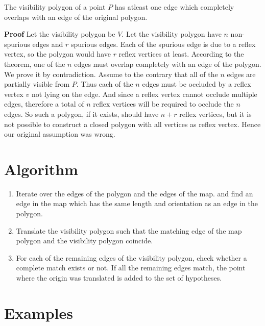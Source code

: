 \begin{theorem}
 The visibility polygon of a point $P$ has atleast one edge which completely overlaps with an edge of the original polygon.
\end{theorem}
{\bf Proof} Let the visibility polygon be $V$. Let the visibility polygon have $n$ non-spurious edges and $r$ spurious edges.
Each of the spurious edge is due to a reflex vertex, so the polygon would have $r$ reflex vertices at least.
 According to the theorem, one of the $n$ edges must overlap completely with an edge of the polygon.
We prove it by contradiction. Assume to the contrary that all of the $n$ edges are partially visible from $P$. Thus each of the $n$
edges must be occluded by a reflex vertex $v$ not lying on the edge. And since a reflex vertex cannot occlude multiple edges, therefore
 a total of $n$ reflex vertices will be required to occlude the $n$ edges.
So such a polygon, if it exists, should have $n+r$ reflex vertices, but it is not possible to construct a closed polygon with all
 vertices as reflex vertex.
Hence our original assumption was wrong.

\section{Algorithm}

\begin{enumerate}
 \item Iterate over the edges of the polygon and the edges of the map. and find an edge in the map which has the same length and
 orientation as an edge in the polygon.

 \item
 Translate the visibility polygon such that the matching edge of the map polygon
and the visibility polygon coincide.

 \item
 For each of the remaining edges of the visibility polygon, check whether a 
complete match exists or not. If all the remaining edges match, the point where the
origin was translated is added to the set of hypotheses.

\end{enumerate}

\newpage

\section{Examples}

